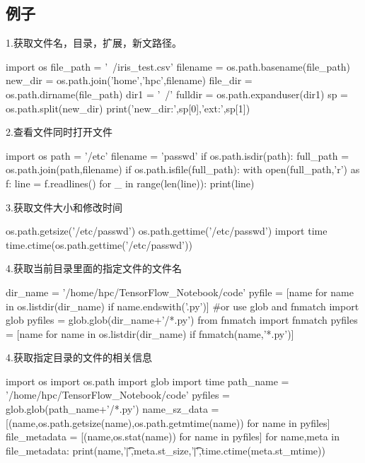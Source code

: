 \subsection{例子}
1.获取文件名，目录，扩展，新文路径。
\begin{python}
import os
file_path = '~/iris_test.csv'
filename = os.path.basename(file_path)
new_dir = os.path.join('home','hpc',filename)
file_dir = os.path.dirname(file_path)
dir1 = '~/'
fulldir = os.path.expanduser(dir1)
sp = os.path.split(new_dir)
print('new_dir:',sp[0],'ext:',sp[1])
\end{python}
2.查看文件同时打开文件
\begin{python}
import os
path = '/etc'
filename = 'passwd'
if os.path.isdir(path):
    full_path = os.path.join(path,filename)
    if os.path.isfile(full_path):
        with open(full_path,'r') as f:
            line = f.readlines()
            for _ in range(len(line)):
                print(line)
\end{python}
3.获取文件大小和修改时间
\begin{python}
os.path.getsize('/etc/passwd')
os.path.gettime('/etc/passwd')
import time
time.ctime(os.path.gettime('/etc/passwd'))
\end{python}
4.获取当前目录里面的指定文件的文件名
\begin{python}
dir_name = '/home/hpc/TensorFlow_Notebook/code'
pyfile = [name for name in os.listdir(dir_name) if name.endswith('.py')]
#or use glob and fnmatch
import glob
pyfiles = glob.glob(dir_name+'/*.py')
from fnmatch import fnmatch
pyfiles = [name for name in os.listdir(dir_name) if fnmatch(name,'*.py')]
\end{python}
4.获取指定目录的文件的相关信息
\begin{python}
import os
import os.path
import glob
import time
path_name = '/home/hpc/TensorFlow_Notebook/code'
pyfiles = glob.glob(path_name+'/*.py')
name_sz_data = [(name,os.path.getsize(name),os.path.getmtime(name)) for name in pyfiles]
file_metadata = [(name,os.stat(name)) for name in pyfiles]
for name,meta in file_metadata:
    print(name,'\t|',meta.st_size,'\t|',time.ctime(meta.st_mtime))

\end{python}

